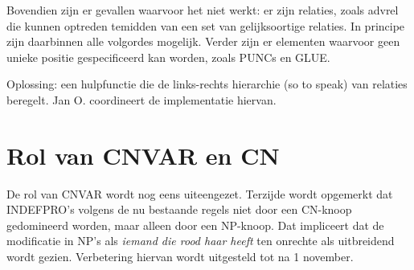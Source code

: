 Bovendien zijn er gevallen 
waarvoor het niet werkt: er zijn relaties, zoals advrel 
die kunnen optreden temidden van 
een set van gelijksoortige relaties. In principe zijn daarbinnen alle volgordes
mogelijk. Verder zijn er elementen waarvoor geen unieke positie 
gespecificeerd kan worden, zoals PUNCs en GLUE. 

Oplossing: een hulpfunctie die de links-rechts hierarchie (so to speak) van 
relaties beregelt. Jan O. coordineert de implementatie hiervan.

\section{Rol van CNVAR en CN}
De rol van CNVAR wordt nog eens uiteengezet. 
Terzijde wordt 
opgemerkt dat INDEFPRO's volgens 
de nu bestaande regels niet door een CN-knoop gedomineerd worden, maar 
alleen door een NP-knoop. Dat impliceert dat de modificatie in 
NP's als {\em iemand die rood haar heeft} 
ten onrechte  als uitbreidend wordt gezien. Verbetering hiervan
wordt uitgesteld tot na 1 november. 

